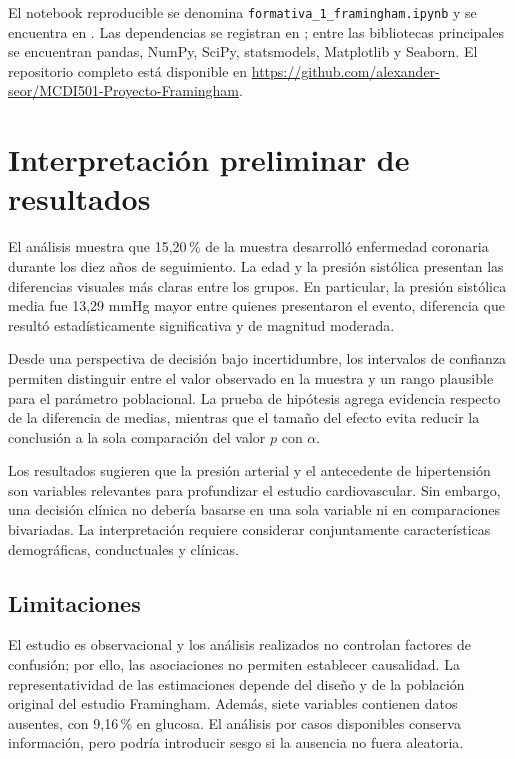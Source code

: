 \documentclass[11pt,a4paper]{article}
\newcommand{\proyRepo}{\url{https://github.com/alexander-seor/MCDI501-Proyecto-Framingham}}
\begin{document}
El notebook reproducible se denomina \texttt{formativa\_1\_framingham.ipynb} y se encuentra en . Las dependencias se registran en ; entre las bibliotecas principales se encuentran pandas, NumPy, SciPy, statsmodels, Matplotlib y Seaborn. El repositorio completo está disponible en \proyRepo.

\section{Interpretación preliminar de resultados}

El análisis muestra que 15,20\,\% de la muestra desarrolló enfermedad coronaria durante los diez años de seguimiento. La edad y la presión sistólica presentan las diferencias visuales más claras entre los grupos. En particular, la presión sistólica media fue 13,29 mmHg mayor entre quienes presentaron el evento, diferencia que resultó estadísticamente significativa y de magnitud moderada.

Desde una perspectiva de decisión bajo incertidumbre, los intervalos de confianza permiten distinguir entre el valor observado en la muestra y un rango plausible para el parámetro poblacional. La prueba de hipótesis agrega evidencia respecto de la diferencia de medias, mientras que el tamaño del efecto evita reducir la conclusión a la sola comparación del valor $p$ con $\alpha$.

Los resultados sugieren que la presión arterial y el antecedente de hipertensión son variables relevantes para profundizar el estudio cardiovascular. Sin embargo, una decisión clínica no debería basarse en una sola variable ni en comparaciones bivariadas. La interpretación requiere considerar conjuntamente características demográficas, conductuales y clínicas.

\subsection{Limitaciones}

El estudio es observacional y los análisis realizados no controlan factores de confusión; por ello, las asociaciones no permiten establecer causalidad. La representatividad de las estimaciones depende del diseño y de la población original del estudio Framingham. Además, siete variables contienen datos ausentes, con 9,16\,\% en glucosa. El análisis por casos disponibles conserva información, pero podría introducir sesgo si la ausencia no fuera aleatoria.
\end{document}
